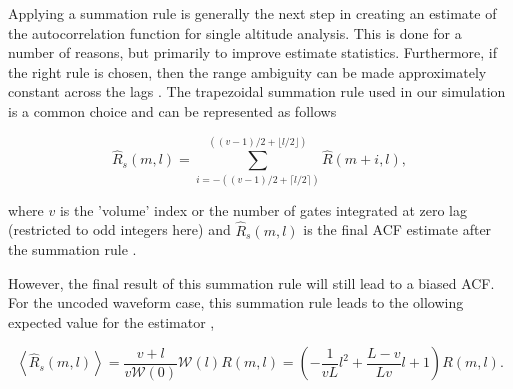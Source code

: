 Applying a summation rule is generally the next step in creating an estimate of the autocorrelation function for single altitude analysis. This is done for a number of reasons, but primarily to improve estimate statistics.  Furthermore, if the right rule is chosen, then the range ambiguity can be made approximately constant across the lags \cite{nygren1996}. The trapezoidal summation rule used in our simulation is a common choice and can be represented as follows

\begin{equation}
\label{eq:sumrule}
\widehat{R}_s(m,l) = \displaystyle\sum\limits_{i=-((v-1)/2+\lceil l/2 \rceil)}^{((v-1)/2+\lfloor l/2\rfloor)} \widehat{R}(m+i,l),
\end{equation}

\noindent where $v$ is the 'volume' index or the number of gates integrated at zero lag (restricted to odd integers here) and $\widehat{R}_s(m,l)$ is the final ACF estimate after the summation rule \cite{nygren1996}. 

However, the final result of this summation rule will still lead to a biased ACF. For the uncoded waveform case, this summation rule leads to the ollowing expected value for the estimator \cite{nygren1996},

\begin{equation}
\label{eq:sumruleest}
\left\langle\widehat{R}_s(m,l) \right\rangle  =\frac{v+l}{v\mathcal{W}(0)}\mathcal{W}(l)R(m,l) =\left(-\frac{1}{vL}l^2+\frac{L-v}{Lv}l+1\right)   R(m,l).
\end{equation}





